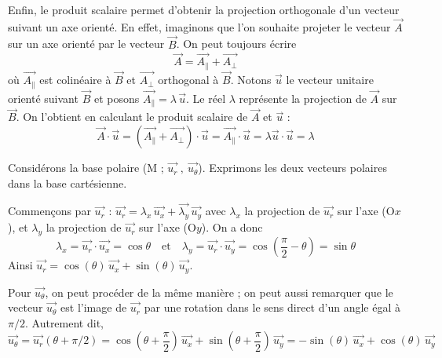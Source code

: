 Enfin, le produit scalaire permet d'obtenir la projection orthogonale d'un vecteur suivant un axe orienté. En effet, imaginons que l'on souhaite projeter le vecteur $\overrightarrow{A}$ sur un axe orienté par le vecteur $\overrightarrow{B}$. On peut toujours écrire 
\[
	\overrightarrow{A}=\overrightarrow{A_\parallel}+\overrightarrow{A_\perp}
\]
où $\overrightarrow{A_\parallel}$ est colinéaire à $\overrightarrow{B}$ et $\overrightarrow{A_\perp}$ orthogonal  à $\overrightarrow{B}$. Notons $\overrightarrow{u}$ le vecteur unitaire orienté suivant $\overrightarrow{B}$ et posons $\overrightarrow{A_\parallel}=\lambda \, \overrightarrow{u}$. Le réel $\lambda$ représente la projection de $\overrightarrow{A}$ sur $\overrightarrow{B}$. On l'obtient en calculant le produit scalaire de $\overrightarrow{A}$ et $\overrightarrow{u}$ : 
\[
	\overrightarrow{A}\cdot \overrightarrow{u}=
	(\overrightarrow{A_\parallel}+\overrightarrow{A_\perp})\cdot \overrightarrow{u}=
	\overrightarrow{A_\parallel}\cdot \overrightarrow{u}=
	\lambda \overrightarrow{u}\cdot \overrightarrow{u}=\lambda	
\]
\begin{kaoexample}[frametitle=Exemple 5 -- Expression de la base polaire dans la bas cartésienne]
Considérons la base polaire (M ; $\overrightarrow{u_r}~,~\overrightarrow{u_\theta}$). Exprimons les deux vecteurs polaires dans la base cartésienne. 

Commençons par $\overrightarrow{u_r}$ : $\overrightarrow{u_r}=\lambda_x\, \overrightarrow{u_x}+\overrightarrow{\lambda_y}\, \overrightarrow{u_y}$ avec $\lambda_x$ la projection de $\overrightarrow{u_r}$ sur l'axe (O$x$), et $\lambda_y$ la projection de $\overrightarrow{u_r}$ sur l'axe (O$y$). On a donc 
\[
	\lambda_x=\overrightarrow{u_r}\cdot\overrightarrow{u_x}=\cos\theta
	\quad\text{et}\quad
	\lambda_y=\overrightarrow{u_r}\cdot\overrightarrow{u_y}=\cos\left(\frac{\pi}{2}-\theta\right)=\sin\theta
\] 
Ainsi $\overrightarrow{u_r}=\cos(\theta)\, \overrightarrow{u_x}+\sin(\theta)\, \overrightarrow{u_y}$.

Pour $\overrightarrow{u_\theta}$, on peut procéder de la même manière ; on peut aussi remarquer que le vecteur $\overrightarrow{u_\theta}$ est l'image de $\overrightarrow{u_r}$ par une rotation dans le sens direct d'un angle égal à $\pi/2$. Autrement dit, 
\[
	\overrightarrow{u_\theta}=\overrightarrow{u_r}(\theta+\pi/2)=
	\cos\left(\theta+\frac{\pi}{2}\right)\, \overrightarrow{u_x}+\sin\left(\theta+\frac{\pi}{2}\right)\, \overrightarrow{u_y}=
	-\sin(\theta)\, \overrightarrow{u_x}+\cos(\theta)\, \overrightarrow{u_y}	
\]
\end{kaoexample} 
